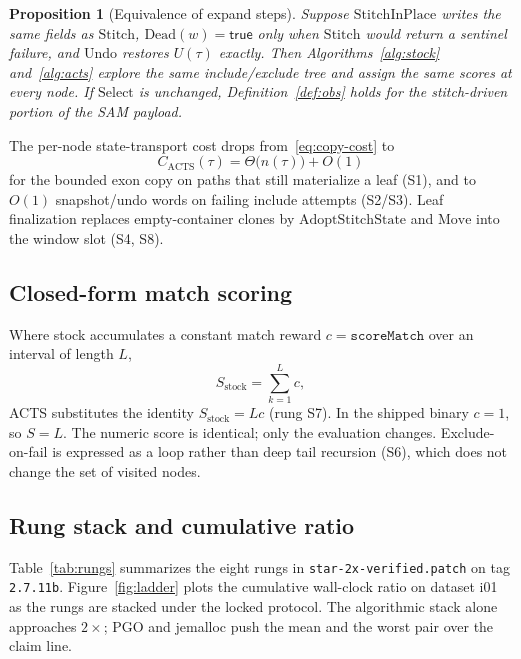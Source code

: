 \documentclass[11pt]{article}
\newtheorem{proposition}{Proposition}
\newcommand{\ACTS}{ACTS\xspace}
\begin{document}
\begin{proposition}[Equivalence of expand steps]
\label{prop:equiv}
Suppose $\mathrm{StitchInPlace}$ writes the same fields as $\mathrm{Stitch}$,
$\mathrm{Dead}(w)=\mathsf{true}$ only when $\mathrm{Stitch}$ would return a
sentinel failure, and $\mathrm{Undo}$ restores $U(\tau)$ exactly.
Then Algorithms~\ref{alg:stock} and~\ref{alg:acts} explore the same
include/exclude tree and assign the same scores at every node.
If $\mathrm{Select}$ is unchanged, Definition~\ref{def:obs} holds for the
stitch-driven portion of the SAM payload.
\end{proposition}

The per-node state-transport cost drops from~\eqref{eq:copy-cost} to
\begin{equation}
\label{eq:acts-cost}
C_{\mathrm{ACTS}}(\tau)=\Theta\bigl(n(\tau)\bigr)+O(1)
\end{equation}
for the bounded exon copy on paths that still materialize a leaf (S1), and to
$O(1)$ snapshot/undo words on failing include attempts (S2/S3).
Leaf finalization replaces empty-container clones by
$\mathrm{AdoptStitchState}$ and $\mathrm{Move}$ into the window slot (S4, S8).

\subsection{Closed-form match scoring}
\label{sec:score}

Where stock accumulates a constant match reward $c=\texttt{scoreMatch}$ over an
interval of length $L$,
\begin{equation}
\label{eq:score-loop}
S_{\mathrm{stock}}=\sum_{k=1}^{L} c,
\end{equation}
\ACTS substitutes the identity $S_{\mathrm{stock}}=Lc$ (rung S7).
In the shipped binary $c=1$, so $S=L$.
The numeric score is identical; only the evaluation changes.
Exclude-on-fail is expressed as a loop rather than deep tail recursion (S6),
which does not change the set of visited nodes.

\subsection{Rung stack and cumulative ratio}
\label{sec:rungs}

Table~\ref{tab:rungs} summarizes the eight rungs in
\texttt{star-2x-verified.patch} on tag \texttt{2.7.11b}.
Figure~\ref{fig:ladder} plots the cumulative wall-clock ratio on dataset i01 as
the rungs are stacked under the locked protocol.
The algorithmic stack alone approaches $2\times$; PGO and jemalloc push the
mean and the worst pair over the claim line.
\end{document}
